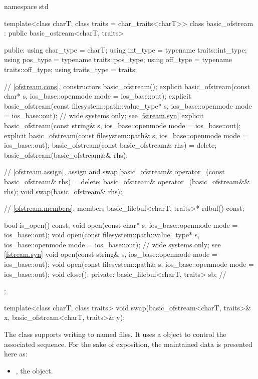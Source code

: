 %
\begin{codeblock}
namespace std {
  template<class charT, class traits = char_traits<charT>>
  class basic_ofstream : public basic_ostream<charT, traits> {
  public:
    using char_type   = charT;
    using int_type    = typename traits::int_type;
    using pos_type    = typename traits::pos_type;
    using off_type    = typename traits::off_type;
    using traits_type = traits;

    // \ref{ofstream.cons}, constructors
    basic_ofstream();
    explicit basic_ofstream(const char* s,
                            ios_base::openmode mode = ios_base::out);
    explicit basic_ofstream(const filesystem::path::value_type* s,
                            ios_base::openmode mode = ios_base::out);  // wide systems only; see \ref{fstream.syn}
    explicit basic_ofstream(const string& s,
                            ios_base::openmode mode = ios_base::out);
    explicit basic_ofstream(const filesystem::path& s,
                            ios_base::openmode mode = ios_base::out);
    basic_ofstream(const basic_ofstream& rhs) = delete;
    basic_ofstream(basic_ofstream&& rhs);

    // \ref{ofstream.assign}, assign and swap
    basic_ofstream& operator=(const basic_ofstream& rhs) = delete;
    basic_ofstream& operator=(basic_ofstream&& rhs);
    void swap(basic_ofstream& rhs);

    // \ref{ofstream.members}, members
    basic_filebuf<charT, traits>* rdbuf() const;

    bool is_open() const;
    void open(const char* s, ios_base::openmode mode = ios_base::out);
    void open(const filesystem::path::value_type* s,
              ios_base::openmode mode = ios_base::out);  // wide systems only; see \ref{fstream.syn}
    void open(const string& s, ios_base::openmode mode = ios_base::out);
    void open(const filesystem::path& s, ios_base::openmode mode = ios_base::out);
    void close();
  private:
    basic_filebuf<charT, traits> sb; // \expos
  };

  template<class charT, class traits>
    void swap(basic_ofstream<charT, traits>& x,
              basic_ofstream<charT, traits>& y);
}
\end{codeblock}

\pnum
The class
supports writing to named files.
It uses a
object to control the associated
sequence.
For the sake of exposition, the maintained data is presented here as:
\begin{itemize}
\item
{}, the  object.
\end{itemize}

